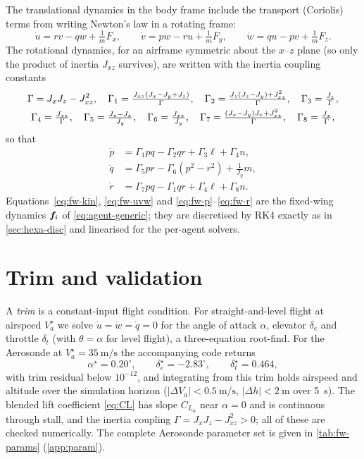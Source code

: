 The translational dynamics in the body frame include the transport (Coriolis)
terms from writing Newton's law in a rotating frame:
\begin{equation}
\dot u=rv-qw+\tfrac1m F_x,\qquad
\dot v=pw-ru+\tfrac1m F_y,\qquad
\dot w=qu-pv+\tfrac1m F_z.
\label{eq:fw-uvw}
\end{equation}
The rotational dynamics, for an airframe symmetric about the $x$--$z$ plane
(so only the product of inertia $J_{xz}$ survives), are written with the inertia
coupling constants
\begin{gather}
\Gamma=J_xJ_z-J_{xz}^2,\quad
\Gamma_1=\tfrac{J_{xz}(J_x-J_y+J_z)}{\Gamma},\quad
\Gamma_2=\tfrac{J_z(J_z-J_y)+J_{xz}^2}{\Gamma},\quad
\Gamma_3=\tfrac{J_z}{\Gamma},\notag\\
\Gamma_4=\tfrac{J_{xz}}{\Gamma},\quad
\Gamma_5=\tfrac{J_z-J_x}{J_y},\quad
\Gamma_6=\tfrac{J_{xz}}{J_y},\quad
\Gamma_7=\tfrac{(J_x-J_y)J_x+J_{xz}^2}{\Gamma},\quad
\Gamma_8=\tfrac{J_x}{\Gamma},
\label{eq:gamma}
\end{gather}
so that
\begin{align}
\dot p&=\Gamma_1 pq-\Gamma_2 qr+\Gamma_3\ell+\Gamma_4 n,\label{eq:fw-p}\\
\dot q&=\Gamma_5 pr-\Gamma_6(p^2-r^2)+\tfrac1{J_y}m,\label{eq:fw-q}\\
\dot r&=\Gamma_7 pq-\Gamma_1 qr+\Gamma_4\ell+\Gamma_8 n.\label{eq:fw-r}
\end{align}
Equations~\eqref{eq:fw-kin}, \eqref{eq:fw-uvw} and
\eqref{eq:fw-p}--\eqref{eq:fw-r} are the fixed-wing dynamics $\bm{f}_i$ of
\cref{eq:agent-generic}; they are discretised by RK4 exactly as in
\cref{sec:hexa-disc} and linearised for the per-agent solvers.

\section{Trim and validation}

A \emph{trim} is a constant-input flight condition. For straight-and-level flight
at airspeed $V_a^{\star}$ we solve $\dot u=\dot w=\dot q=0$ for the angle of
attack $\alpha$, elevator $\delta_e$ and throttle $\delta_t$ (with
$\theta=\alpha$ for level flight), a three-equation root-find. For the Aerosonde
at $V_a^{\star}=\SI{35}{\meter\per\second}$ the accompanying code returns
\begin{equation}
\alpha^{\star}=0.20^\circ,\qquad
\delta_e^{\star}=-2.83^\circ,\qquad
\delta_t^{\star}=0.464,
\end{equation}
with trim residual below $10^{-12}$, and integrating from this trim holds
airspeed and altitude over the simulation horizon
($|\Delta V_a|<\SI{0.5}{\meter\per\second}$, $|\Delta h|<\SI{2}{\meter}$ over
\SI{5}{\second}). The blended lift coefficient \cref{eq:CL} has slope
$C_{L_\alpha}$ near $\alpha=0$ and is continuous through stall, and the inertia
coupling $\Gamma=J_xJ_z-J_{xz}^2>0$; all of these are checked numerically. The
complete Aerosonde parameter set is given in \cref{tab:fw-params}
(\cref{app:param}).
